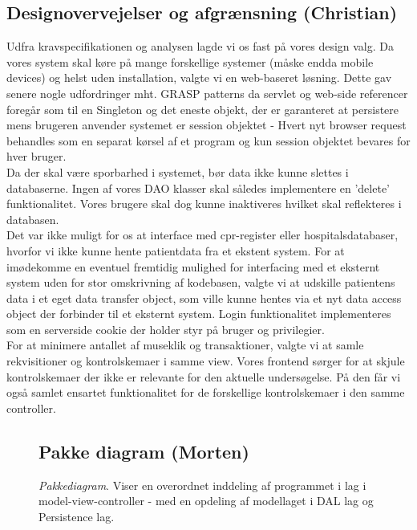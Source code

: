 \subsection*{Designovervejelser og afgrænsning (Christian)}
Udfra kravspecifikationen og analysen lagde vi os fast på vores design valg. Da
vores system skal køre på mange forskellige systemer (måske endda mobile
devices) og helst uden installation, valgte vi en web-baseret løsning. Dette gav
senere nogle udfordringer mht. GRASP patterns da servlet og web-side referencer
foregår som til en Singleton og det eneste objekt, der er garanteret at
persistere mens brugeren anvender systemet er session objektet - Hvert nyt
browser request behandles som en separat kørsel af et program og kun session
objektet bevares for hver bruger.\\
Da der skal være sporbarhed i systemet, bør data ikke kunne slettes i
databaserne. Ingen af vores DAO klasser skal således implementere en 'delete'
funktionalitet. Vores brugere skal dog kunne inaktiveres hvilket skal
reflekteres i databasen.\\
Det var ikke muligt for os at interface med cpr-register eller
hospitalsdatabaser, hvorfor vi ikke kunne hente patientdata fra et ekstent
system. For at imødekomme en eventuel fremtidig mulighed for interfacing med et
eksternt system uden for stor omskrivning af kodebasen, valgte vi at udskille
patientens data i et eget data transfer object, som ville kunne hentes via et
nyt data access object der forbinder til et eksternt system. Login
funktionalitet implementeres som en serverside cookie der holder styr på bruger
og privilegier.\\
For at minimere antallet af museklik og transaktioner, valgte vi at samle
rekvisitioner og kontrolskemaer i samme view. Vores frontend sørger for at
skjule kontrolskemaer der ikke er relevante for den aktuelle undersøgelse. På
den får vi også samlet ensartet funktionalitet for de forskellige kontrolskemaer
i den samme controller.\\
\FloatBarrier
\begin{figure}[h]
\subsection*{Pakke diagram (Morten)}
\centering
{}
\caption{\emph{Pakkediagram}. Viser en overordnet inddeling af programmet i lag
i model-view-controller - med en opdeling af modellaget i DAL lag og Persistence
lag. \label{pakke_diagram}}
\end{figure}
\FloatBarrier
